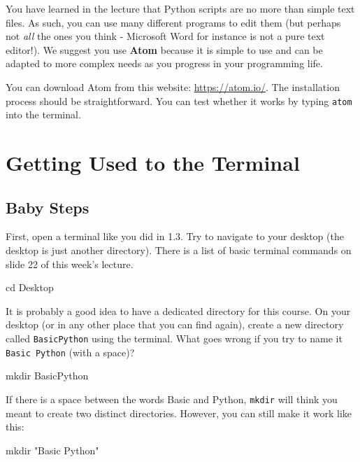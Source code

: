 You have learned in the lecture that Python scripts are no more than simple text files. As such, you can use many different programs to edit them (but perhaps not \textit{all} the ones you think - Microsoft Word for instance is not a pure text editor!). We suggest you use \textbf{Atom} because it is simple to use and can be adapted to more complex needs as you progress in your programming life.

\vspace{1em}

\noindent You can download Atom from this website: \url{https://atom.io/}. The installation process should be straightforward. You can test whether it works by typing \texttt{atom} into the terminal.


\section{Getting Used to the Terminal}

\subsection{Baby Steps}

First, open a terminal like you did in 1.3. Try to navigate to your desktop (the desktop is just another directory). There is a list of basic terminal commands on slide 22 of this week's lecture.

\vspace{1em}

\begin{solution}
    \begin{outputcode}
cd Desktop
    \end{outputcode}
\end{solution}

\noindent It is probably a good idea to have a dedicated directory for this course. On your desktop (or in any other place that you can find again), create a new directory called \texttt{BasicPython} using the terminal. What goes wrong if you try to name it \texttt{Basic Python} (with a space)?

\vspace{1em}
\begin{solution}
    \begin{outputcode}
mkdir BasicPython
    \end{outputcode}

    \noindent If there is a space between the words Basic and Python, \texttt{mkdir} will think you meant to create two distinct directories. However, you can still make it work like this:

    \begin{outputcode}
mkdir "Basic Python"
    \end{outputcode}

\end{solution}

